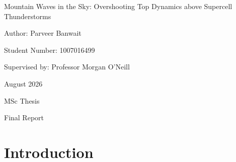 \documentclass[12pt]{article}
\begin{document}
\setlength{\cftaftertoctitleskip}{2cm} %
\setlength{\cftafterloftitleskip}{2cm} %
\setlength{\cftafterlottitleskip}{2cm} %
\begin{titlepage}
    \centering %
    {\Huge Mountain Waves in the Sky: Overshooting Top Dynamics above Supercell Thunderstorms \par} %
    \vspace{2cm}
    {\huge Author: Parveer Banwait \par}
    \vspace{0.25cm}
    {\large Student Number: 1007016499 \par}
    \vspace{1cm}
    {\Large Supervised by: Professor Morgan O'Neill \par}
    \vfill %
    {\Large August 2026 \par}
    \vspace{0.25cm}
    {\Large MSc Thesis \par}
    \vspace{0.25cm}
    {\Large Final Report \par}
\end{titlepage}
\vspace*{\fill}
\begin{abstract}
\begin{spacing}{2.0}
Abstract
\end{spacing}
\end{abstract}
\vspace*{\fill}
\newpage
\renewcommand{\abstractname}{Acknowledgements}  %
\vspace*{\fill}
\begin{abstract}
I would like to express my gratitude to my supervisor Morgan O'Neill for ....
\end{abstract}
\vspace*{\fill}

\newpage

\tableofcontents

\newpage

\listoffigures

\newpage

\listoftables

\newpage

\section{Introduction}
\end{document}
